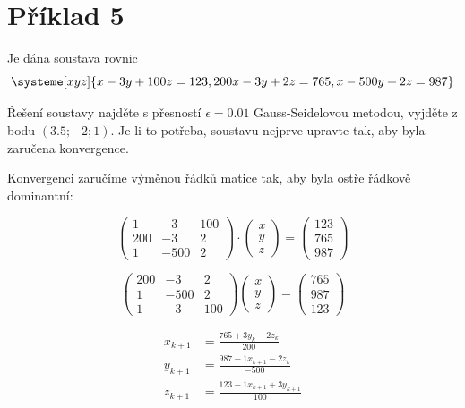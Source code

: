 \documentclass[12pt,a4paper]{article}
\newcommand{\pageline}{\noindent\makebox[\linewidth]{\rule{\linewidth}{0.4pt}}\vspace{5pt}}
\begin{document}
\newpage
\section*{Příklad 5}





Je dána soustava rovnic
\[
\systeme[xyz]
{
x - 3y + 100z = 123,
200x - 3y + 2z = 765,
x - 500y + 2z = 987
}
\] 

Řešení soustavy najděte s přesností $\epsilon = 0.01$ Gauss-Seidelovou metodou, vyjděte z bodu $(3.5; -2; 1)$. Je-li to potřeba, soustavu nejprve upravte tak, aby byla zaručena konvergence.
\newline \pageline


Konvergenci zaručíme výměnou řádků matice tak, aby byla ostře řádkově dominantní:

\[
\begin{pmatrix} 
    1 & -3 & 100\\
    200 & -3 & 2\\
    1 & -500 & 2
\end{pmatrix} \cdot
\begin{pmatrix} 
    x\\
    y\\
    z
\end{pmatrix} 
=
\begin{pmatrix} 123\\765\\987 \end{pmatrix} 
\]

\[
\begin{pmatrix} 
    200 & -3 & 2\\
    1 & -500 & 2\\
    1 & -3 & 100
\end{pmatrix}
\begin{pmatrix} 
    x\\
    y\\
    z
\end{pmatrix} 
=
\begin{pmatrix} 765\\987\\123 \end{pmatrix} 
\] 


\begin{align*}
    x_{k+1}&=\frac{765 + 3y_k - 2z_k}{200}\\
    y_{k+1}&=\frac{987 - 1x_{k+1} - 2z_k}{-500}\\
    z_{k+1}&=\frac{123 - 1x_{k+1} + 3y_{k+1}}{100}
\end{align*}
\end{document}
